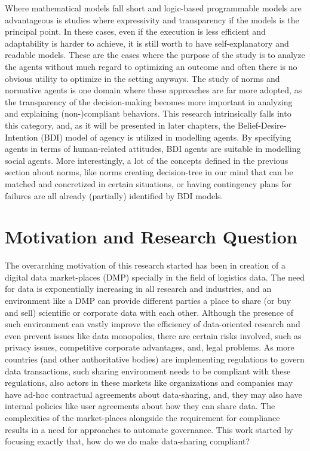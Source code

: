 Where mathematical models fall short and logic-based programmable models are advantageous is studies where expressivity and transparency if the models is the principal point. In these cases, even if the execution is less efficient and adaptability is harder to achieve, it is still worth to have self-explanatory and readable models. These are the cases where the purpose of the study is to analyze the agents without much regard to optimizing an outcome and often there is no obvious utility to optimize in the setting anyways. The study of norms and normative agents is one domain where these approaches are far more adopted, as the transparency of the decision-making becomes more important in analyzing and explaining (non-)compliant behaviors. This research intrinsically falls into this category, and, as it will be presented in later chapters, the Belief-Desire-Intention (BDI) model of agency \cite{Something} is utilized in modelling agents. By specifying agents in terms of human-related attitudes, BDI agents are suitable in modelling social agents. More interestingly, a lot of the concepts defined in the previous section about norms, like norms creating decision-tree in our mind that can be matched and concretized in certain situations, or having contingency plans for failures are all already (partially) identified by BDI models.


\section{Motivation and Research Question}
The overarching motivation of this research started has been in creation of a digital data market-places (DMP) specially in the field of logistics data. The need for data is exponentially increasing in all research and industries, and an environment like a DMP can provide different parties a place to share (or buy and sell) scientific or corporate data with each other. Although the presence of such environment can vastly improve the efficiency of data-oriented research and even prevent issues like data monopolies, there are certain risks involved, such as privacy issues, competitive corporate advantages, and, legal problems. As more countries (and other authoritative bodies) are implementing regulations to govern data transactions, such sharing environment needs to be compliant with these regulations, also actors in these markets like organizations and companies may have ad-hoc contractual agreements about data-sharing, and, they may also have internal policies like user agreements about how they can share data. The complexities of the market-places alongside the requirement for compliance results in a need for approaches to automate governance. This work started by focusing exactly that, how do we do make data-sharing compliant? 

